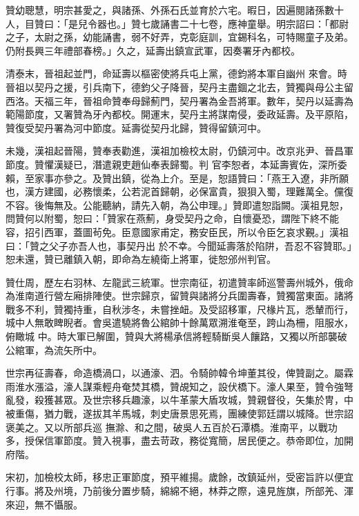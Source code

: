 \begin{pinyinscope}
 贊幼聰慧，明宗甚愛之，與諸孫、外孫石氏並育於六宅。暇日，因遍閱諸孫數十人，目贊曰：「是兒令器也。」贊七歲誦書二十七卷，應神童舉。明宗詔曰：「都尉之子，太尉之孫，幼能誦書，弱不好弄，克彰庭訓，宜錫科名，可特賜童子及弟。仍附長興三年禮部春榜。」久之，延壽出鎮宣武軍，因奏署牙內都校。



 清泰末，晉祖起並門，命延壽以樞密使將兵屯上黨，德鈞將本軍自幽州
 來會。時晉祖以契丹之援，引兵南下，德鈞父子降晉，契丹主盡錮之北去，贊獨與母公主留西洛。天福三年，晉祖命贊奉母歸薊門，契丹署為金吾將軍。數年，契丹以延壽為範陽節度，又署贊為牙內都校。開運末，契丹主將謀南侵，委政延壽。及平原陷，贊復受契丹署為河中節度。延壽從契丹北歸，贊得留鎮河中。



 未幾，漢祖起晉陽，贊奉表勸進，漢祖加檢校太尉，仍鎮河中。改京兆尹、晉昌軍節度。贊懼漢疑已，潛遣親吏趙仙奉表歸蜀。判
 官李恕者，本延壽賓佐，深所委賴，至家事亦參之。及贊出鎮，從為上介。至是，恕語贊曰：「燕王入遼，非所願也，漢方建國，必務懷柔，公若泥首歸朝，必保富貴，狠狽入蜀，理難萬全。儻復不容。後悔無及。公能聽納，請先入朝，為公申理。」贊即遣恕詣闕。漢祖見恕，問贊何以附蜀，恕曰：「贊家在燕薊，身受契丹之命，自懷憂恐，謂陛下終不能容，招引西軍，蓋圖茍免。臣意國家甫定，務安臣民，所以令臣乞哀求覲。」漢祖曰：「贊之父子亦吾人也，事契丹出
 於不幸。今聞延壽落於陷阱，吾忍不容贊耶。」恕未還，贊已離鎮入朝，即命為左繞衛上將軍，徙恕邠州判官。



 贊仕周，歷左右羽林、左龍武三統軍。世宗南征，初遣贊率師巡警壽州城外，俄命為淮南道行營左廂排陣使。世宗歸京，留贊與諸將分兵圍壽春，贊獨當東面。諸將戰多不利，贊獨持重，自秋涉冬，未嘗挫衄。及受詔移軍，尺椽片瓦，悉輦而行，城中人無敢睥睨者。會吳遣驍將魯公綰帥十餘萬眾溯淮奄至，跨山為柵，阻服水，俯瞰城
 中。時大軍已解圍，贊與大將楊承信將輕騎斷吳人饟路，又獨以所部襲破公綰軍，為流矢所中。



 世宗再征壽春，命造橋渦口，以通濠、泗。令騎帥韓令坤董其役，俾贊副之。屬霖雨淮水漲溢，濠人謀乘輕舟奄焚其橋，贊覘知之，設伏橋下。濠人果至，贊令強弩亂發，殺獲甚眾。及世宗移兵趣濠，以牛革蒙大盾攻城，贊親督役，矢集於冑，中被重傷，猶力戰，遂拔其羊馬城，刺史唐景思死焉，團練使郭廷謂以城降。世宗詔褒美之。又以所部兵巡
 撫滁、和之間，破吳人五百於石潭橋。淮南平，以戰功多，授保信軍節度。贊入視事，盡去苛政，務從寬簡，居民便之。恭帝即位，加開府階。



 宋初，加檢校太師，移忠正軍節度，預平維揚。歲餘，改鎮延州，受密旨許以便宜行事。將及州境，乃前後分置步騎，綿綿不絕，林莽之際，遠見旌旗，所部羌、渾來迎，無不懾服。




\end{pinyinscope}
